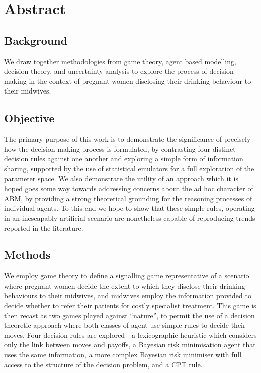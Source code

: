 \begingroup
\let\clearpage\relax
\let\cleardoublepage\relax


\section*{Abstract}

\subsection*{Background}

We draw together methodologies from game theory, agent based modelling, decision theory, and uncertainty analysis to explore the process of decision making in the context of pregnant women disclosing their drinking behaviour to their midwives.

\subsection*{Objective} 

The primary purpose of this work is to demonstrate the significance of precisely how the decision making process is formulated, by contrasting four distinct decision rules against one another and exploring a simple form of information sharing, supported by the use of statistical emulators for a full exploration of the parameter space.
We also demonstrate the utility of an approach which it is hoped goes some way towards addressing concerns about the ad hoc character of \ac{ABM}, by providing a strong theoretical grounding for the reasoning processes of individual agents. To this end we hope to show that these simple rules, operating in an inescapably artificial scenario are nonetheless capable of reproducing trends reported in the literature.

\subsection*{Methods} 

We employ game theory to define a signalling game representative of a scenario where pregnant women decide the extent to which they disclose their drinking behaviours to their midwives, and midwives employ the information provided to decide whether to refer their patients for costly specialist treatment. This game is then recast as two games played against \enquote{nature}, to permit the use of a decision theoretic approach where both classes of agent use simple rules to decide their moves.
Four decision rules are explored - a lexicographic heuristic which considers only the link between moves and payoffs, a Bayesian risk minimisation agent that uses the same information, a more complex Bayesian risk minimiser with full access to the structure of the decision problem, and a \ac{CPT} rule.

